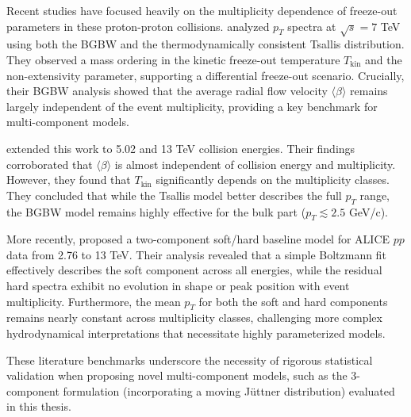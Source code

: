 Recent studies have focused heavily on the multiplicity dependence of freeze-out parameters in these proton-proton collisions. \citet{Khuntia2019} analyzed $p_T$ spectra at $\sqrt{s} = 7$ TeV using both the BGBW and the thermodynamically consistent Tsallis distribution. They observed a mass ordering in the kinetic freeze-out temperature $T_{\text{kin}}$ and the non-extensivity parameter, supporting a differential freeze-out scenario. Crucially, their BGBW analysis showed that the average radial flow velocity $\langle \beta \rangle$ remains largely independent of the event multiplicity, providing a key benchmark for multi-component models.

\citet{Rath2020} extended this work to 5.02 and 13 TeV collision energies. Their findings corroborated that $\langle \beta \rangle$ is almost independent of collision energy and multiplicity. However, they found that $T_{\text{kin}}$ significantly depends on the multiplicity classes. They concluded that while the Tsallis model better describes the full $p_T$ range, the BGBW model remains highly effective for the bulk part ($p_T \lesssim 2.5$ GeV/c).

More recently, \citet{Biro2025} proposed a two-component soft/hard baseline model for ALICE $pp$ data from 2.76 to 13 TeV. Their analysis revealed that a simple Boltzmann fit effectively describes the soft component across all energies, while the residual hard spectra exhibit no evolution in shape or peak position with event multiplicity. Furthermore, the mean $p_T$ for both the soft and hard components remains nearly constant across multiplicity classes, challenging more complex hydrodynamical interpretations that necessitate highly parameterized models.

These literature benchmarks underscore the necessity of rigorous statistical validation when proposing novel multi-component models, such as the 3-component formulation (incorporating a moving J\"uttner distribution) evaluated in this thesis.
